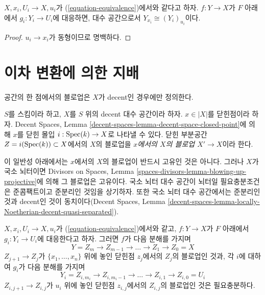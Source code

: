 \begin{lemma}
\label{lemma-equivalence-fibre}
$X, x_i, U_i \to X, u_i$가 (\ref{equation-equivalence})에서와 같다고 하자.
$f : Y \to X$가 $F$ 아래에서 $g_i : Y_i \to U_i$에 대응하면,
대수 공간으로서 $Y_{x_i} \cong (Y_i)_{u_i}$이다.
\end{lemma}

\begin{proof}
$u_i \to x_i$가 동형이므로 명백하다.
\end{proof}





\section{이차 변환에 의한 지배}
\label{section-quadratic-spaces}

\noindent
공간의 한 점에서의 블로업은 $X$가 decent인 경우에만 정의한다.

\begin{definition}
\label{definition-blowup-at-point}
$S$를 스킴이라 하고, $X$를 $S$ 위의 decent 대수 공간이라 하자.
$x \in |X|$를 닫힌점이라 하자. Decent Spaces, Lemma
\ref{decent-spaces-lemma-decent-space-closed-point}에 의해
$x$를 닫힌 몰입 $i : \mathop{\mathrm{Spec}}(k) \to X$로 나타낼 수 있다.
닫힌 부분공간 $Z = i(\mathop{\mathrm{Spec}}(k)) \subset X$에서의 $X$의 블로업을
{\it $x$에서의 $X$의 블로업 $X' \to X$}이라 한다.
\end{definition}

\noindent
이 일반성 아래에서는 $x$에서의 $X$의 블로업이 반드시 고유인 것은 아니다.
그러나 $X$가 국소 뇌터이면 Divisors on Spaces, Lemma
\ref{spaces-divisors-lemma-blowing-up-projective}에 의해
그 블로업은 고유이다.
국소 뇌터 대수 공간이 뇌터일 필요충분조건은
준콤팩트이고 준분리인 것임을 상기하자. 또한 국소 뇌터 대수 공간에서는
준분리인 것과 decent인 것이 동치이다(Decent Spaces, Lemma
\ref{decent-spaces-lemma-locally-Noetherian-decent-quasi-separated}).

\begin{lemma}
\label{lemma-equivalence-sequence-blowups}
$X, x_i, U_i \to X, u_i$가 (\ref{equation-equivalence})에서와 같고,
$f : Y \to X$가 $F$ 아래에서 $g_i : Y_i \to U_i$에 대응한다고 하자.
그러면 $f$가 다음 분해를 가지며
$$
Y = Z_m \to Z_{m - 1} \to \ldots \to Z_1 \to Z_0 = X
$$
$Z_{j + 1} \to Z_j$가 $\{x_1, \ldots, x_n\}$ 위에 놓인 닫힌점
$z_j$에서의 $Z_j$의 블로업인 것과, 각 $i$에 대하여 $g_i$가
다음 분해를 가지며
$$
Y_i = Z_{i, m_i} \to Z_{i, m_i - 1} \to \ldots \to Z_{i, 1} \to Z_{i, 0} = U_i
$$
$Z_{i, j + 1} \to Z_{i, j}$가 $u_i$ 위에 놓인 닫힌점
$z_{i, j}$에서의 $Z_{i, j}$의 블로업인 것은 필요충분하다.
\end{lemma}

